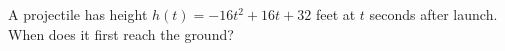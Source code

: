 A projectile has height $h(t)=-16t^2+16t+32$ feet at $t$ seconds after launch. When does it first reach the ground?

